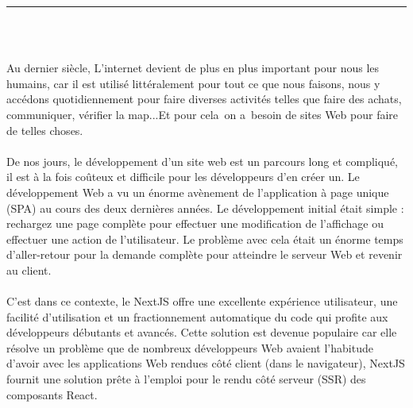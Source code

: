 \documentclass[12pt]{report}
\begin{document}


\newpage

\pagestyle{myfancy}

\vspace*{-0.2in}

\setcounter{page}{1}

\begin{center}
    {\color{Blue} \rule{6.2in}{1.4mm} }\\
    \vspace{0.1in}
    \scshape{\fontsize{34}{46}{\bfseries{\color{Blue}{Introduction générale}}}}
    \\
    \vspace{0.5in}
\end{center}
Au dernier siècle, L'internet devient de plus en plus important pour nous les humains, car il est utilisé littéralement pour tout ce que nous faisons, nous y accédons quotidiennement pour faire diverses activités telles que faire des achats, communiquer, vérifier la map...Et pour cela on a besoin de sites Web pour faire de telles choses.
\\\\
De nos jours, le développement d'un site web est un parcours long et compliqué, il est à la fois coûteux et difficile pour les développeurs d'en créer un. Le développement Web a vu un énorme avènement de l’application à page unique (SPA) au cours des deux dernières années. Le développement initial était simple : rechargez une page complète pour effectuer une modification de l’affichage ou effectuer une action de l’utilisateur. Le problème avec cela était un énorme temps d’aller-retour pour la demande complète pour atteindre le serveur Web et revenir au client.
\\\\
C’est dans ce contexte, le NextJS offre une excellente expérience utilisateur, une facilité d’utilisation et un fractionnement automatique du code qui profite aux développeurs débutants et avancés. Cette solution est devenue populaire car elle résolve un problème que de nombreux développeurs Web avaient l’habitude d’avoir avec les applications Web rendues côté client (dans le navigateur), NextJS fournit une solution prête à l’emploi pour le rendu côté serveur (SSR) des composants React.
\end{document}
